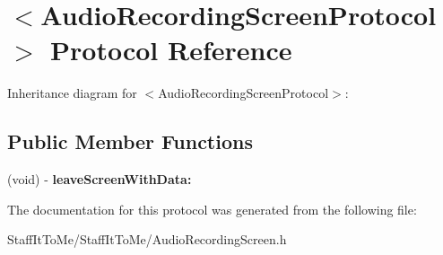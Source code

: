 \hypertarget{protocol_audio_recording_screen_protocol-p}{
\section{$<$\-Audio\-Recording\-Screen\-Protocol$>$ \-Protocol \-Reference}
\label{protocol_audio_recording_screen_protocol-p}
}


\-Inheritance diagram for $<$\-Audio\-Recording\-Screen\-Protocol$>$\-:
\subsection*{\-Public \-Member \-Functions}
\begin{DoxyCompactItemize}
\item 
\hypertarget{protocol_audio_recording_screen_protocol-p_ad332a84cb7001259a743675f166690e8}{
(void) -\/ {\bfseries leave\-Screen\-With\-Data\-:}}
\label{protocol_audio_recording_screen_protocol-p_ad332a84cb7001259a743675f166690e8}

\end{DoxyCompactItemize}


\-The documentation for this protocol was generated from the following file\-:\begin{DoxyCompactItemize}
\item 
\-Staff\-It\-To\-Me/\-Staff\-It\-To\-Me/\-Audio\-Recording\-Screen.\-h\end{DoxyCompactItemize}
